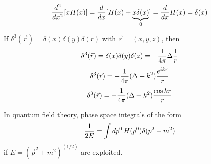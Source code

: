  \begin{equation}
 {d^2\over dx^2}[x H (x)] = {d \over dx }[H(x) + \underbrace{x \delta  (x)}_{0}]={d \over dx } H(x)  = \delta (x)
 \end{equation}

If $ \delta^{3} ({\vec r})=
\delta (x)
\delta (y)
\delta (r)$ with ${\vec r}=(x,y,z)$, then
 \begin{equation}
 \delta^{3} ({\vec r})=\delta (x)\delta (y)\delta (z)=-{1\over 4\pi }\Delta {1\over  r }
 \end{equation}
 \begin{equation}
 \delta^{3}  ({\vec r})=-{1\over 4\pi }(\Delta +k^2){e^{ikr}\over r}
 \end{equation}
 \begin{equation}
 \delta^{3}  ({\vec r})=-{1\over 4\pi }(\Delta +k^2){\cos kr\over r}
 \end{equation}

In quantum field theory,  phase space integrals of the form
 \begin{equation}
 {1\over 2E}=\int dp^0 \, H (p^0)\delta (p^2-m^2)
 \end{equation}
 if $E=({\vec p}^2+m^2)^{(1/2)}$
 are exploited.




